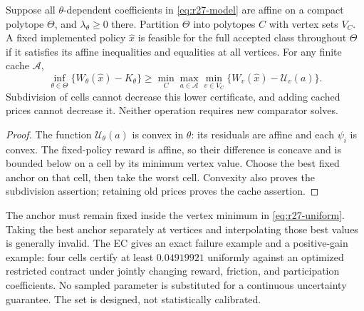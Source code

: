 \begin{corollary}\label{cor:r27-cells}
Suppose all $\theta$-dependent coefficients in \eqref{eq:r27-model} are affine on a compact polytope $\Theta$, and $\lambda_\theta\geq0$ there. Partition $\Theta$ into polytopes $C$ with vertex sets $V_C$. A fixed implemented policy $\widehat x$ is feasible for the full accepted class throughout $\Theta$ if it satisfies its affine inequalities and equalities at all vertices. For any finite cache $\mathcal A$,
\begin{equation}\label{eq:r27-uniform}
 \inf_{\theta\in\Theta}\{W_\theta(\widehat x)-K_\theta\}
 \geq\min_C\max_{a\in\mathcal A}\min_{v\in V_C}
       \{W_v(\widehat x)-\mathcal U_v(a)\}.
\end{equation}
Subdivision of cells cannot decrease this lower certificate, and adding cached prices cannot decrease it. Neither operation requires new comparator solves.
\end{corollary}
\begin{proof}
The function $\mathcal U_\theta(a)$ is convex in $\theta$: its residuals are affine and each $\psi_i$ is convex. The fixed-policy reward is affine, so their difference is concave and is bounded below on a cell by its minimum vertex value. Choose the best fixed anchor on that cell, then take the worst cell. Convexity also proves the subdivision assertion; retaining old prices proves the cache assertion.\end{proof}

The anchor must remain fixed inside the vertex minimum in \eqref{eq:r27-uniform}. Taking the best anchor separately at vertices and interpolating those best values is generally invalid. The EC gives an exact failure example and a positive-gain example: four cells certify at least $0.04919921$ uniformly against an optimized restricted contract under jointly changing reward, friction, and participation coefficients. No sampled parameter is substituted for a continuous uncertainty guarantee. The set is designed, not statistically calibrated.
